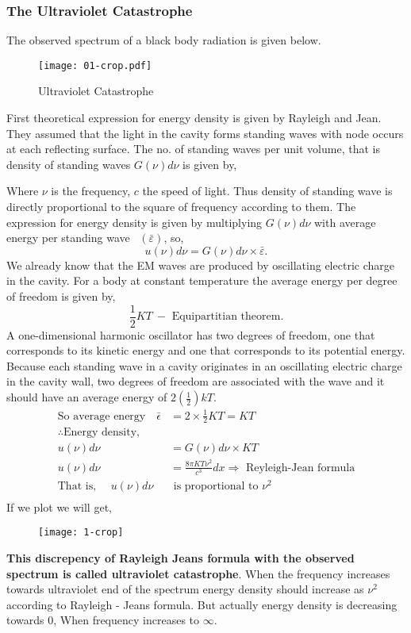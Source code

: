   \subsubsection{The Ultraviolet Catastrophe}
  The observed spectrum of a black body radiation is given below.
  \begin{figure}[H]
  	\centering
  	\texttt{[image: 01-crop.pdf]}
  	\caption{Ultraviolet Catastrophe}
  	\label{Ultraviolet Catastrophe}
  \end{figure}
  First theoretical expression for energy density is given by 
  Rayleigh and Jean. They assumed that the light in the cavity forms standing waves with node occurs at each reflecting surface. The no. of standing waves per unit volume, that is density of standing waves $G(\nu) d \nu$ is given by,
  \begin{center}
  \end{center}
  Where $\nu$ is the frequency, $c$  the speed of light. Thus density of standing wave is directly proportional to the square of frequency according to them. The expression for energy density is given by multiplying $G({\nu}) d \nu$ with average energy per standing wave \  $(\bar{\varepsilon})$, so,$$u(\nu) d \nu=G(\nu) d \nu \times \bar{\varepsilon} .$$
  We already know that the EM waves are produced by oscillating electric charge in the cavity. For a body at constant temperature the average energy per degree of freedom is given by, $$\frac{1}{2}KT \ -\text{ Equipartitian theorem.}$$ 
  A one-dimensional harmonic oscillator has two degrees of freedom, one that corresponds to its kinetic energy and one that corresponds to its potential energy. Because each standing wave in a cavity originates in an oscillating electric charge in the cavity wall, two degrees of freedom are associated with the wave and it should have an average energy of $2\left(\frac{1}{2}\right) k T$.
  \begin{align*}
  \text{So average energy} \quad\bar{\epsilon}&=2 \times \frac{1}{2} {KT}={KT}\\
  \therefore \text{Energy density,}\\
  u(\nu) d \nu&=G(\nu) d \nu \times K T\\
  u(\nu) d \nu&=\frac{8 \pi K T \nu^{2}}{c^{3}} d x \Rightarrow\text{ Reyleigh-Jean formula}\\
  \text{That is, }\quad u(\nu) d\nu &\text{ is proportional to } \nu^{2}\\
  \end{align*}
  If we plot we will get,
  \begin{figure}[H]
  	\centering
  	\texttt{[image: 1-crop]}
  	\caption{}
  	\label{}
  \end{figure}
  \textbf{This discrepency of Rayleigh Jeans formula with the observed spectrum is called ultraviolet catastrophe}. When the frequency increases towards ultraviolet end of the spectrum energy density should increase as $\nu^{2}$ according to Rayleigh - Jeans formula. But actually energy density is decreasing towards $0$, When frequency increases to $\infty$.
